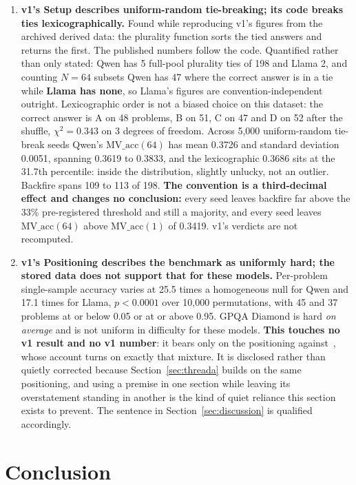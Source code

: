 \documentclass{article}
\begin{document}
\begin{enumerate}
\item \textbf{v1's Setup describes uniform-random tie-breaking; its code breaks
ties lexicographically.} Found while reproducing v1's figures from the archived
derived data: the plurality function sorts the tied answers and returns the
first. The published numbers follow the code. Quantified rather than only
stated: Qwen has 5 full-pool plurality ties of 198 and Llama 2, and counting
$N=64$ subsets Qwen has 47 where the correct answer is in a tie while
\textbf{Llama has none}, so Llama's figures are convention-independent
outright. Lexicographic order is not a biased choice on this dataset: the
correct answer is A on 48 problems, B on 51, C on 47 and D on 52 after the
shuffle, $\chi^2 = 0.343$ on 3 degrees of freedom. Across 5,000 uniform-random
tie-break seeds Qwen's $\text{MV\_acc}(64)$ has mean 0.3726 and standard
deviation 0.0051, spanning 0.3619 to 0.3833, and the lexicographic 0.3686 sits
at the 31.7th percentile: inside the distribution, slightly unlucky, not an
outlier. Backfire spans 109 to 113 of 198. \textbf{The convention is a
third-decimal effect and changes no conclusion:} every seed leaves backfire far
above the 33\% pre-registered threshold and still a majority, and every seed
leaves $\text{MV\_acc}(64)$ above $\text{MV\_acc}(1)$ of 0.3419. v1's verdicts
are not recomputed.

\item \textbf{v1's Positioning describes the benchmark as uniformly hard; the
stored data does not support that for these models.} Per-problem single-sample
accuracy varies at 25.5 times a homogeneous null for Qwen and 17.1 times for
Llama, $p < 0.0001$ over 10,000 permutations, with 45 and 37 problems at or
below 0.05 or at or above 0.95. GPQA Diamond is hard \emph{on average} and is
not uniform in difficulty for these models. \textbf{This touches no v1 result
and no v1 number}: it bears only on the positioning against~\citet{chen2024more},
whose account turns on exactly that mixture. It is disclosed rather than quietly
corrected because Section~\ref{sec:threada} builds on the same positioning, and
using a premise in one section while leaving its overstatement standing in
another is the kind of quiet reliance this section exists to prevent. The
sentence in Section~\ref{sec:discussion} is qualified accordingly.
\end{enumerate}

\section{Conclusion}
\end{document}
